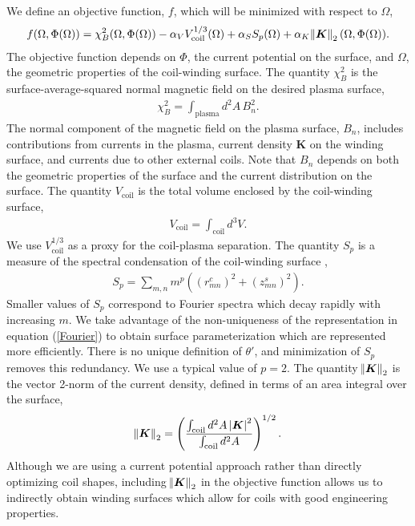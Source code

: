 \documentclass[aps,unsortedaddress]{revtex4-1}
\begin{document}
We define an objective function, $f$, which will be minimized with respect to $\Omega$,
\begin{gather}
f(\Omega, \Phi(\Omega))  = \chi^2_B(\Omega, \Phi(\Omega)) - \alpha_V V_{\text{coil}}^{1/3}(\Omega) + \alpha_S S_p(\Omega) + \alpha_K  \norm{\bm{K}}_2(\Omega, \Phi(\Omega)).
\label{objective_function}
\end{gather}
The objective function depends on $\Phi$, the current potential on the surface, and $\Omega$, the geometric properties of the coil-winding surface. The quantity $\chi^2_B$ is the surface-average-squared normal magnetic field on the desired plasma surface,
\begin{gather}
\chi^2_B = \int_{\text{plasma}} d^2 A \, B_n^2.
\label{chi2_B}
\end{gather}
The normal component of the magnetic field on the plasma surface, $B_n$, includes contributions from currents in the plasma, current density $\bm{K}$ on the winding surface, and currents due to other external coils. Note that $B_n$ depends on both the geometric properties of the surface and the current distribution on the surface. The quantity $V_{\text{coil}}$ is the total volume enclosed by the coil-winding surface,
\begin{gather}
V_{\text{coil}} = \int_{\text{coil}} d^3 V.
\end{gather}
We use $V_{\text{coil}}^{1/3}$ as a proxy for the coil-plasma separation. The quantity $S_p$ is a measure of the spectral condensation of the coil-winding surface \cite{Hirshman1985},
\begin{gather}
S_p = \sum_{m,n} m^{p} \left( (r_{mn}^c)^2 + (z_{mn}^s)^2 \right).
\end{gather}
Smaller values of $S_p$ correspond to Fourier spectra which decay rapidly with increasing $m$. We take advantage of the non-uniqueness of the representation in equation (\ref{Fourier}) to obtain surface parameterization which are represented more efficiently. There is no unique definition of $\theta'$,
and minimization of $S_p$ removes this redundancy.
We use a typical value of $p=2$. The quantity $\norm{\bm{K}}_2$ is the vector 2-norm of the current density, defined in terms of an area integral over the surface,
\begin{gather}
\norm{\bm{K}}_2 = \left( \frac{\int_{\text{coil}} d^2 A \, \abs{\bm{K}}^2}{\int_{\text{coil}} d^2 A}  \right)^{1/2}.
\end{gather}
Although we are using a current potential approach rather than directly optimizing coil shapes, including $\norm{\bm{K}}_2$ in the objective function allows us to indirectly obtain winding surfaces which allow for coils with good engineering properties. 
\end{document}
